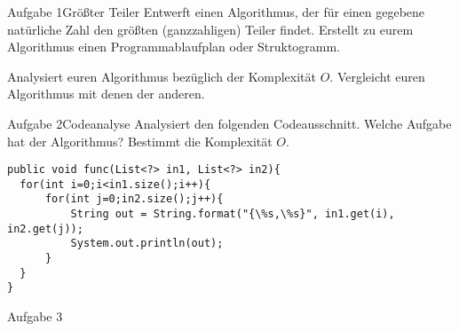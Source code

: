 \begin{frame}{Aufgabe 1}{Größter Teiler}
Entwerft einen Algorithmus, der für einen gegebene natürliche Zahl den größten (ganzzahligen) Teiler findet. Erstellt zu eurem Algorithmus einen Programmablaufplan oder Struktogramm.

Analysiert euren Algorithmus bezüglich der Komplexität $O$. Vergleicht euren Algorithmus mit denen der anderen.
\end{frame}

\begin{frame}[fragile]{Aufgabe 2}{Codeanalyse}
Analysiert den folgenden Codeausschnitt. Welche Aufgabe hat der Algorithmus? Bestimmt die Komplexität $O$.

\lstset{style=java}
\begin{lstlisting}
public void func(List<?> in1, List<?> in2){
  for(int i=0;i<in1.size();i++){
      for(int j=0;in2.size();j++){
          String out = String.format("{\%s,\%s}", in1.get(i), in2.get(j));
          System.out.println(out);
      }
  }
}
\end{lstlisting}
\end{frame}

\begin{frame}{Aufgabe 3}{}
\end{frame}
